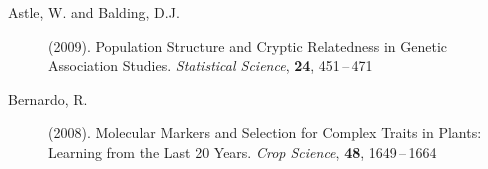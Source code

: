 \documentclass[twoside]{report}
\begin{document}


\begin{description}
\item[Astle, W. and Balding, D.J.] (2009).
		Population Structure and Cryptic Relatedness in Genetic Association Studies.
		{\it Statistical Science}, {\bf 24}, 451\,--\,471
\item[Bernardo, R.] (2008). 
		Molecular Markers and Selection for Complex Traits in Plants: Learning from the Last 20 Years.
		{\it Crop Science}, {\bf 48}, 1649\,--\,1664
		

\end{description}
\end{document}
